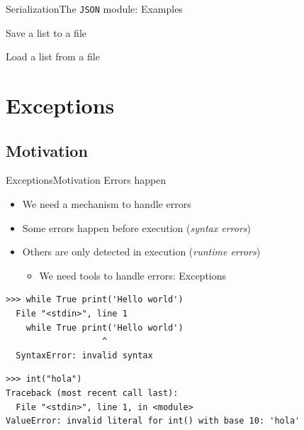 \documentclass[10pt,compress]{beamer} %
\begin{document}
\begin{frame}[fragile]{Serialization}{The \texttt{JSON} module: Examples}
	\begin{exampleblock}{Save a list to a file}
	\vspace{-0.2cm}
	
	\vspace{-0.2cm}
	\end{exampleblock}

	\begin{exampleblock}{Load a list from a file}
	\vspace{-0.2cm}
	
	\vspace{-0.2cm}
	\end{exampleblock}
\end{frame}

\section{Exceptions}
\subsection{Motivation}

\begin{frame}[fragile]{Exceptions}{Motivation}
	Errors happen
	\begin{itemize}
		\item We need a mechanism to handle errors
	    \item Some errors happen before execution (\textit{syntax errors})

		\item Others are only detected in execution (\textit{runtime errors})
        \begin{itemize}
        \item We need tools to handle errors: Exceptions
        \end{itemize}
    \end{itemize}
\begin{verbatim}
>>> while True print('Hello world')
  File "<stdin>", line 1
    while True print('Hello world')
                   ^
  SyntaxError: invalid syntax
\end{verbatim}

\begin{verbatim}
>>> int("hola")
Traceback (most recent call last):
  File "<stdin>", line 1, in <module>
ValueError: invalid literal for int() with base 10: 'hola'
\end{verbatim}
\end{frame}
\end{document}
